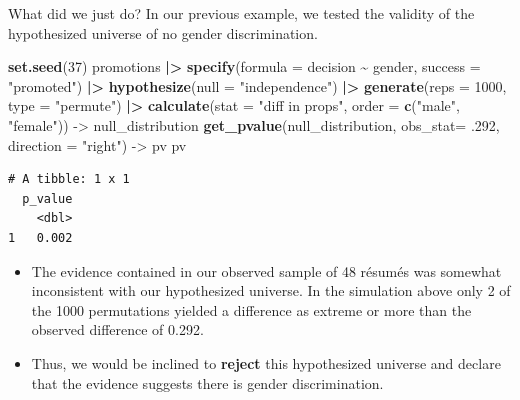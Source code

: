 \documentclass[
  ignorenonframetext,
]{beamer}
\newenvironment{Shaded}{\begin{snugshade}}{\end{snugshade}}
\newcommand{\AttributeTok}[1]{\textcolor[rgb]{0.13,0.29,0.53}{#1}}
\newcommand{\DecValTok}[1]{\textcolor[rgb]{0.00,0.00,0.81}{#1}}
\newcommand{\FunctionTok}[1]{\textcolor[rgb]{0.13,0.29,0.53}{\textbf{#1}}}
\newcommand{\NormalTok}[1]{#1}
\newcommand{\OtherTok}[1]{\textcolor[rgb]{0.56,0.35,0.01}{#1}}
\newcommand{\SpecialCharTok}[1]{\textcolor[rgb]{0.81,0.36,0.00}{\textbf{#1}}}
\newcommand{\StringTok}[1]{\textcolor[rgb]{0.31,0.60,0.02}{#1}}
\begin{document}
\begin{frame}[fragile]{What did we just do?}
\protect\hypertarget{what-did-we-just-do-1}{}
In our previous example, we tested the validity of the hypothesized
universe of no gender discrimination.

\tiny

\begin{Shaded}
\begin{Highlighting}[]
\FunctionTok{set.seed}\NormalTok{(}\DecValTok{37}\NormalTok{)}
\NormalTok{promotions }\SpecialCharTok{|\textgreater{}} 
  \FunctionTok{specify}\NormalTok{(}\AttributeTok{formula =}\NormalTok{ decision }\SpecialCharTok{\textasciitilde{}}\NormalTok{ gender, }\AttributeTok{success =} \StringTok{"promoted"}\NormalTok{) }\SpecialCharTok{|\textgreater{}} 
  \FunctionTok{hypothesize}\NormalTok{(}\AttributeTok{null =} \StringTok{"independence"}\NormalTok{) }\SpecialCharTok{|\textgreater{}} 
  \FunctionTok{generate}\NormalTok{(}\AttributeTok{reps =} \DecValTok{1000}\NormalTok{, }\AttributeTok{type =} \StringTok{"permute"}\NormalTok{) }\SpecialCharTok{|\textgreater{}} 
  \FunctionTok{calculate}\NormalTok{(}\AttributeTok{stat =} \StringTok{"diff in props"}\NormalTok{, }\AttributeTok{order =} \FunctionTok{c}\NormalTok{(}\StringTok{"male"}\NormalTok{, }\StringTok{"female"}\NormalTok{)) }\OtherTok{{-}\textgreater{}}\NormalTok{ null\_distribution}
\FunctionTok{get\_pvalue}\NormalTok{(null\_distribution, }\AttributeTok{obs\_stat=}\NormalTok{ .}\DecValTok{292}\NormalTok{, }\AttributeTok{direction =} \StringTok{"right"}\NormalTok{) }\OtherTok{{-}\textgreater{}}\NormalTok{ pv}
\NormalTok{pv}
\end{Highlighting}
\end{Shaded}

\begin{verbatim}
# A tibble: 1 x 1
  p_value
    <dbl>
1   0.002
\end{verbatim}

\normalsize

\begin{itemize}
\item
  The evidence contained in our observed sample of 48 résumés was
  somewhat inconsistent with our hypothesized universe. In the
  simulation above only 2 of the 1000 permutations yielded a difference
  as extreme or more than the observed difference of 0.292.
\item
  Thus, we would be inclined to \textbf{reject} this hypothesized
  universe and declare that the evidence suggests there is gender
  discrimination.
\end{itemize}
\end{frame}
\end{document}
